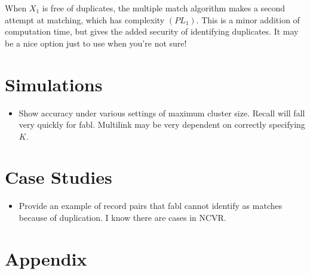 \documentclass[12pt,letterpaper]{article}
\newcommand{\1}[1]{\mathbb{I}\!\left[#1\right]} %
\begin{document}
When $X_1$ is free of duplicates, the multiple match algorithm makes a second attempt at matching, which has complexity $ \left(P L_1 \right)$. This is a minor addition of computation time, but gives the added security of identifying duplicates. It may be a nice option just to use when you're not sure!

\section{Simulations}
\begin{itemize}
	\item Show accuracy under various settings of maximum cluster size. Recall will fall very quickly for fabl. Multilink may be very dependent on correctly specifying $K$. 
\end{itemize}
\section{Case Studies}
\begin{itemize}
	\item Provide an example of record pairs that fabl cannot identify as matches because of duplication. I know there are cases in NCVR.
\end{itemize}



\section{Appendix}
\label{sec:appendix}
\end{document}

